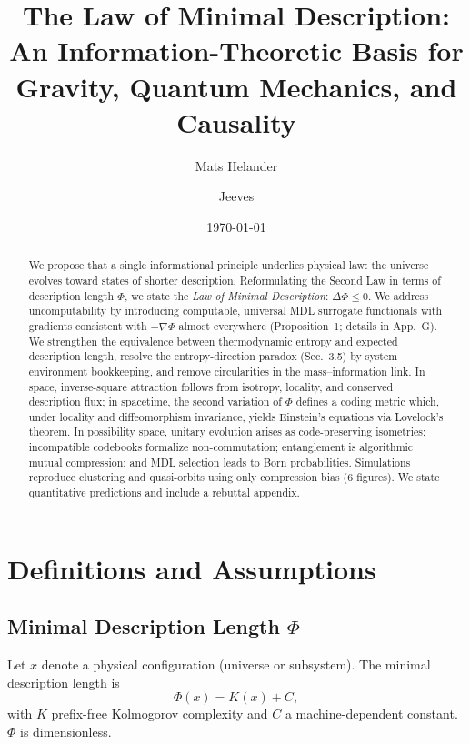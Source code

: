 \documentclass[aps,preprint,onecolumn,longbibliography,nofootinbib]{revtex4-2}
\numberwithin{equation}{section}
\begin{document}
\title{The Law of Minimal Description: An Information-Theoretic Basis for Gravity, Quantum Mechanics, and Causality}

\author{Mats Helander}
\author{Jeeves}

\date{\today}

\begin{abstract}
We propose that a single informational principle underlies physical law: the universe evolves toward states of shorter description. Reformulating the Second Law in terms of description length $\Phi$, we state the \emph{Law of Minimal Description}: $\Delta\Phi \le 0$. We address uncomputability by introducing computable, universal MDL surrogate functionals with gradients consistent with $-\nabla\Phi$ almost everywhere (Proposition~1; details in App.~G). We strengthen the equivalence between thermodynamic entropy and expected description length, resolve the entropy-direction paradox (Sec.~3.5) by system--environment bookkeeping, and remove circularities in the mass--information link. In space, inverse-square attraction follows from isotropy, locality, and conserved description flux; in spacetime, the second variation of $\Phi$ defines a coding metric which, under locality and diffeomorphism invariance, yields Einstein’s equations via Lovelock’s theorem. In possibility space, unitary evolution arises as code-preserving isometries; incompatible codebooks formalize non-commutation; entanglement is algorithmic mutual compression; and MDL selection leads to Born probabilities. Simulations reproduce clustering and quasi-orbits using only compression bias (6 figures). We state quantitative predictions and include a rebuttal appendix.
\end{abstract}

\maketitle

\section{Definitions and Assumptions}
\subsection{Minimal Description Length $\Phi$}
Let $x$ denote a physical configuration (universe or subsystem). The minimal description length is
\begin{equation}
\Phi(x) = K(x) + C,\label{eq:Kdef}
\end{equation}
with $K$ prefix-free Kolmogorov complexity and $C$ a machine-dependent constant. $\Phi$ is dimensionless.
\end{document}
